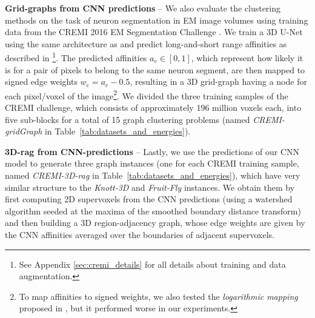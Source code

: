 \textbf{Grid-graphs from CNN predictions} -- We also evaluate the clustering methods on the task of neuron segmentation in EM image volumes using training data from the CREMI 2016 EM Segmentation Challenge \cite{cremiChallenge}.
We train a 3D U-Net \cite{ronneberger2015u,cciccek20163d} using the same architecture as \cite{funke2018large} and predict long-and-short range affinities 
as described in \cite{lee2017superhuman}\footnote{See Appendix \ref{sec:cremi_details} for all details about training and data augmentation.}. The predicted affinities $a_e\in[0,1]$, which represent how likely it is for a pair of pixels to belong to the same neuron segment, are then mapped to signed edge weights $w_e=a_e-0.5$, resulting in a 3D grid-graph having a node for each pixel/voxel of the  image\footnote{To map affinities to signed weights, we also tested the \emph{logarithmic mapping} proposed in \cite{finkel2008enforcing,andres2012globally}, but it performed worse in our experiments.}. We divided the three training samples of the CREMI challenge, which consists of approximately 196 million voxels each, into five sub-blocks for a total of 15 graph clustering problems (named \emph{CREMI-gridGraph} in Table~\ref{tab:datasets_and_energies}). 

\textbf{3D-rag from CNN-predictions} -- Lastly, we use the predictions of our CNN model to generate three graph instances (one for each CREMI training sample, named \emph{CREMI-3D-rag} in Table~\ref{tab:datasets_and_energies}), which have very similar structure to the \emph{Knott-3D} and \emph{Fruit-Fly} instances.  We obtain them by first computing 2D supervoxels from the CNN predictions (using a watershed algorithm seeded at the maxima of the smoothed boundary distance transform) and then building a 3D region-adjacency graph, whose edge weights are given by the CNN affinities averaged over the boundaries of adjacent supervoxels.






